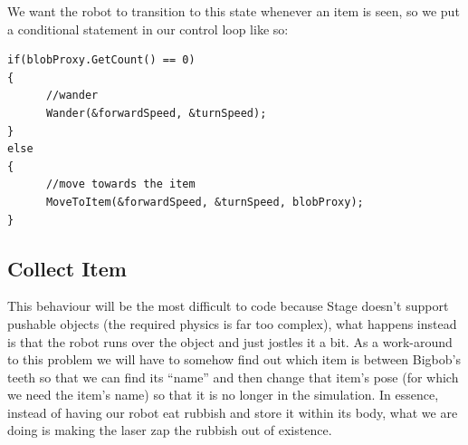 \documentclass[a4paper]{report}
\begin{document}
We want the robot to transition to this state whenever an item is seen, so we put a conditional statement in our control loop like so:
\begin{verbatim}
if(blobProxy.GetCount() == 0)
{
      //wander
      Wander(&forwardSpeed, &turnSpeed);
}
else
{
      //move towards the item
      MoveToItem(&forwardSpeed, &turnSpeed, blobProxy);
}
\end{verbatim}

\subsection{Collect Item}
This behaviour will be the most difficult to code because Stage doesn't support pushable objects (the required physics is far too complex), what happens instead is that the robot runs over the object and just jostles it a bit. 
As a work-around to this problem we will have to somehow find out which item is between Bigbob's teeth so that we can find its ``name'' and then change that item's pose (for which we need the item's name) so that it is no longer in the simulation. In essence, instead of having our robot eat rubbish and store it within its body, what we are doing is making the laser zap the rubbish out of existence.
\end{document}
